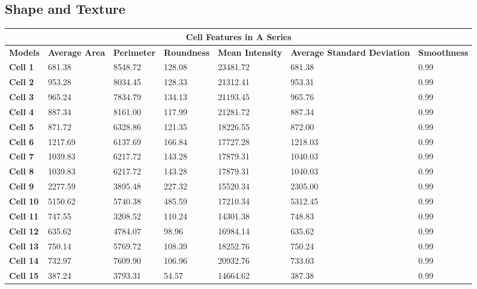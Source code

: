 \documentclass{article}
\begin{document}
\subsection*{Shape and Texture}


\begin{table}[h!]
\centering
\begin{tabular}{ |p{1.7cm}|p{1.7cm}|p{1.7cm}|p{1.7cm}|p{1.7cm}|p{1.7cm}|p{1.7cm}| }
\hline
\multicolumn{7}{|c|}{\textbf{Cell Features in A Series}} \\
\hline
\textbf{Models} & \textbf{Average Area} & \textbf{Perimeter} & \textbf{Roundness} & \textbf{Mean Intensity} & \textbf{Average Standard Deviation} & \textbf{Smoothness} \\
\hline
\textbf{Cell 1} & 681.38 & 8548.72 & 128.08 & 23481.72 & 681.38 & 0.99 \\
\textbf{Cell 2} & 953.28 & 8034.45 & 128.33 & 21312.41 & 953.31 & 0.99 \\
\textbf{Cell 3} & 965.24 & 7834.79 & 134.13 & 21193.45 & 965.76 & 0.99 \\
\textbf{Cell 4} & 887.34 & 8161.00 & 117.99 & 21281.72 & 887.34 & 0.99 \\
\textbf{Cell 5} & 871.72 & 6328.86 & 121.35 & 18226.55 & 872.00 & 0.99 \\
\textbf{Cell 6} & 1217.69 & 6137.69 & 166.84 & 17727.28 & 1218.03 & 0.99 \\
\textbf{Cell 7} & 1039.83 & 6217.72 & 143.28 & 17879.31 & 1040.03 & 0.99 \\
\textbf{Cell 8} & 1039.83 & 6217.72 & 143.28 & 17879.31 & 1040.03 & 0.99 \\
\textbf{Cell 9} & 2277.59 & 3895.48 & 227.32 & 15520.34 & 2305.00 & 0.99 \\
\textbf{Cell 10} & 5150.62 & 5740.38 & 485.59 & 17210.34 & 5312.45 & 0.99 \\
\textbf{Cell 11} & 747.55 & 3208.52 & 110.24 & 14301.38 & 748.83 & 0.99 \\
\textbf{Cell 12} & 635.62 & 4784.07 & 98.96 & 16984.14 & 635.62 & 0.99 \\
\textbf{Cell 13} & 750.14 & 5769.72 & 108.39 & 18252.76 & 750.24 & 0.99 \\
\textbf{Cell 14} & 732.97 & 7609.90 & 106.96 & 20932.76 & 733.03 & 0.99 \\
\textbf{Cell 15} & 387.24 & 3793.31 & 54.57 & 14664.62 & 387.38 & 0.99\\
\hline
\end{tabular}
\end{table}
\end{document}

